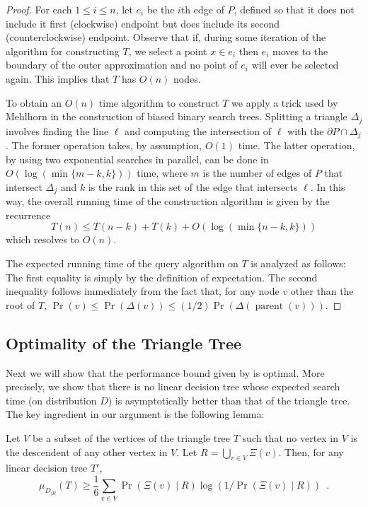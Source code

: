 \documentclass[charterfonts,lotsofwhite]{patmorin}
\newcommand{\boundary}{\partial}
\DeclareMathOperator{\prnt}{parent}
\begin{document}
\begin{proof}
For each $1\le i\le n$, let $e_i$ be the $i$th edge of $P$,
defined so that it does not include it first (clockwise) endpoint but
does include its second (counterclockwise) endpoint.  Observe that if,
during some iteration of the algorithm for constructing $T$, we select
a point $x\in e_i$ then $e_i$ moves to the boundary of the outer
approximation and no point of $e_i$ will ever be selected again.
This implies that $T$ has $O(n)$ nodes.

To obtain an $O(n)$ time algorithm to construct $T$ we apply a trick
used by Mehlhorn \cite{m75} in the construction of biased binary
search trees.  Splitting a triangle $\Delta_j$ involves finding the
line $\ell$ and computing the intersection of $\ell$ with the
$\boundary P\cap \Delta_j$.  The former operation takes, by
assumption, $O(1)$ time.  The latter operation, by using two
exponential searches in parallel, can be done in $O(\log
(\min\{m-k,k\}))$ time, where $m$ is the number of edges of $P$ that
intersect $\Delta_j$ and $k$ is the rank in this set of the edge that
intersects $\ell$.  In this way, the overall running time of the
construction algorithm is given by the recurrence
\[
    T(n) \le T(n-k) + T(k) + O(\log(\min\{n-k,k\}))
\]
which resolves to $O(n)$.

The expected running time of the query algorithm on $T$ is
analyzed as follows: The first equality is simply by the definition of
expectation.  The second inequality follows immediately from the fact
that, for any node $v$ other than the root of $T$, $\Pr(v)\le
\Pr(\Delta(v))\le (1/2)\Pr(\Delta(\prnt(v)))$.
\end{proof}


\subsection{Optimality of the Triangle Tree}

Next we will show that the performance bound given by
 is optimal.  More precisely, we show that there
is no linear decision tree whose expected search time (on distribution
$D$) is asymptotically better than that of the triangle tree.  The key
ingredient in our argument is the following lemma:

\begin{lem}
Let $V$ be a subset of the vertices of the triangle tree $T$ such that
no vertex in $V$ is the descendent of any other vertex in $V$.  
Let $R=\bigcup_{v\in V} \Xi(v)$. Then, for any linear decision
tree $T'$,
\[
    \mu_{D_{|R}}(T) 
	\ge \frac{1}{6}\sum_{v\in V}\Pr(\Xi(v)\mid
R)\log(1/\Pr(\Xi(v)\mid R)) \enspace .
\]
\end{lem}
\end{document}
